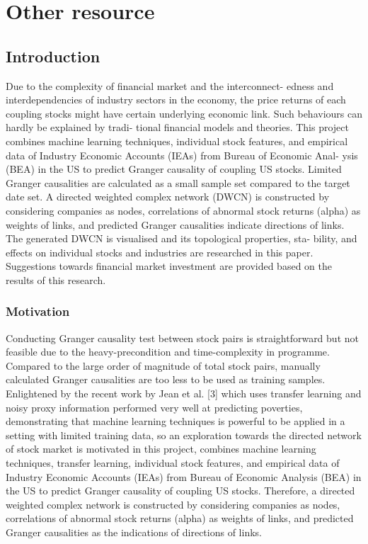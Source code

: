 \chapter{Other resource}
\label{cpt:other}
\section{Introduction}
Due to the complexity of financial market and the interconnect- edness and interdependencies of industry sectors in the economy, the price returns of each coupling stocks might have certain underlying economic link. Such behaviours can hardly be explained by tradi- tional financial models and theories. This project combines machine learning techniques, individual stock features, and empirical data of Industry Economic Accounts (IEAs) from Bureau of Economic Anal- ysis (BEA) in the US to predict Granger causality of coupling US stocks. Limited Granger causalities are calculated as a small sample set compared to the target date set. A directed weighted complex network (DWCN) is constructed by considering companies as nodes, correlations of abnormal stock returns (alpha) as weights of links, and predicted Granger causalities indicate directions of links. The generated DWCN is visualised and its topological properties, sta- bility, and effects on individual stocks and industries are researched in this paper. Suggestions towards financial market investment are provided based on the results of this research.

\subsection{Motivation}
Conducting Granger causality test between stock pairs is straightforward but not feasible due to the heavy-precondition and time-complexity in programme. Compared to the large order of magnitude of total stock pairs, manually calculated Granger causalities are too less to be used as training samples. Enlightened by the recent work by Jean et al. [3] which uses transfer learning and noisy proxy information performed very well at predicting poverties, demonstrating that machine learning techniques is powerful to be applied in a setting with limited training data, so an exploration towards the directed network of stock market is motivated in this project, combines machine learning techniques, transfer learning, individual stock features, and empirical data of Industry Economic Accounts (IEAs) from Bureau of Economic Analysis (BEA) in the US to predict Granger causality of coupling US stocks. Therefore, a directed weighted complex network is constructed by considering companies as nodes, correlations of abnormal stock returns (alpha) as weights of links, and predicted Granger causalities as the indications of directions of links.

